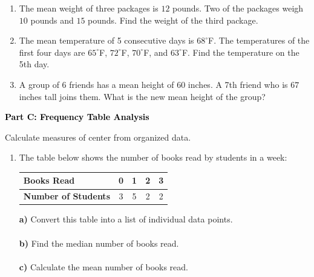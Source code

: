 \documentclass[12pt, letterpaper, fleqn]{article}
\newcommand{\blanklong}{\underline{\hspace{6.5cm}}}
\begin{document}
\begin{enumerate}[itemsep=2.5cm, leftmargin=0.6cm]
\item The mean weight of three packages is $12$ pounds. Two of the packages weigh $10$ pounds and $15$ pounds. Find the weight of the third package.
\vspace{1.5cm}

\item The mean temperature of 5 consecutive days is $68^\circ$F. The temperatures of the first four days are $65^\circ$F, $72^\circ$F, $70^\circ$F, and $63^\circ$F. Find the temperature on the 5th day.
\vspace{1.5cm}

\item A group of 6 friends has a mean height of $60$ inches. A 7th friend who is $67$ inches tall joins them. What is the new mean height of the group?
\end{enumerate}

\newpage

\begin{tcolorbox}[colback=black!10]
    \large\textcolor{black}{\textbf{Part C: Frequency Table Analysis}}
\end{tcolorbox}

\vspace{3mm}

\noindent
Calculate measures of center from organized data.

\vspace{5mm}

\begin{enumerate}[itemsep=2.5cm, leftmargin=0.6cm]
\item The table below shows the number of books read by students in a week: \\
\begin{center}
\begin{tabular}{|l|c|c|c|c|}
\hline
\textbf{Books Read} & 0 & 1 & 2 & 3 \\ \hline
\textbf{Number of Students} & 3 & 5 & 2 & 2 \\
\hline
\end{tabular}
\end{center}
\vspace{0.5cm}
\textbf{a)} Convert this table into a list of individual data points. \\
\blanklong \\
\textbf{b)} Find the median number of books read. \\
\blanklong \\
\textbf{c)} Calculate the mean number of books read. \\
\blanklong
\end{enumerate}
\end{document}

